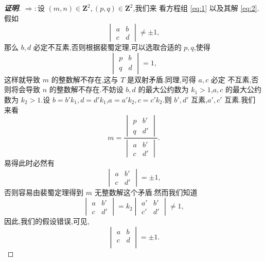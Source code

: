 \documentclass[twoside,11pt]{article}
\begin{document}
\begin{proof}[\textbf{证明}]
$\Rightarrow:$设 $(m,n)\in \mathbf{Z}^2,(p,q)\in \mathbf{Z}^2$,我们来
看方程组 \ref{eq:1} 以及其解 \ref{eq:2}.假如
$$
\begin{vmatrix}
  a&b\\
c&d
\end{vmatrix}\neq \pm 1,
$$
那么 $b,d$ 必定不互素,否则根据裴蜀定理,可以选取合适的 $p,q$,使得
$$
\begin{vmatrix}
  p&b\\
q&d
\end{vmatrix}=1,
$$
这样就导致 $m$ 的整数解不存在,这与 $T$ 是双射矛盾.同理,可得 $a,c$ 必定
不互素,否则将会导致 $n$ 的整数解不存在.不妨设 $b,d$ 的最大公约数为
$k_1>1$,$a,c$ 的最大公约数为 $k_2>1$.设
$b=b'k_1,d=d'k_1$,$a=a'k_2,c=c'k_2$.则 $b',d'$ 互素,$a',c'$ 互素.我们
来看
$$
m=\frac{\begin{vmatrix}
    p&b'\\
q&d'
  \end{vmatrix}}{\begin{vmatrix}
    a&b'\\
c&d'
  \end{vmatrix}}.
$$
易得此时必然有
$$
\begin{vmatrix}
  a&b'\\
c&d'
\end{vmatrix}=\pm 1,
$$
否则容易由裴蜀定理得到 $m$ 无整数解这个矛盾.然而我们知道
$$
\begin{vmatrix}
  a&b'\\
c&d'
\end{vmatrix}=k_2 \begin{vmatrix}
  a'&b'\\
c'&d'
\end{vmatrix}\neq 1,
$$
因此,我们的假设错误,可见,
$$
\begin{vmatrix}
  a&b\\
c&d\\
\end{vmatrix}=\pm 1.
$$
\end{proof}
%
\end{document}
